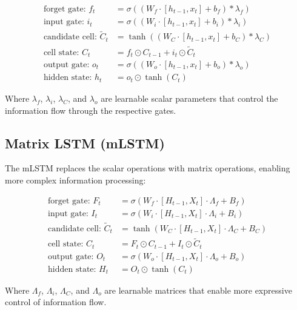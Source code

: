 \documentclass[11pt,a4paper]{article}
\begin{document}
\begin{align}
\text{forget gate: } f_t &= \sigma((W_f \cdot [h_{t-1}, x_t] + b_f) * \lambda_f) \label{eq:slstm_forget} \\
\text{input gate: } i_t &= \sigma((W_i \cdot [h_{t-1}, x_t] + b_i) * \lambda_i) \label{eq:slstm_input} \\
\text{candidate cell: } \tilde{C}_t &= \tanh((W_C \cdot [h_{t-1}, x_t] + b_C) * \lambda_C) \label{eq:slstm_candidate} \\
\text{cell state: } C_t &= f_t \odot C_{t-1} + i_t \odot \tilde{C}_t \label{eq:slstm_cell} \\
\text{output gate: } o_t &= \sigma((W_o \cdot [h_{t-1}, x_t] + b_o) * \lambda_o) \label{eq:slstm_output} \\
\text{hidden state: } h_t &= o_t \odot \tanh(C_t) \label{eq:slstm_hidden}
\end{align}

Where $\lambda_f$, $\lambda_i$, $\lambda_C$, and $\lambda_o$ are learnable scalar parameters that control the information flow through the respective gates.

\subsection{Matrix LSTM (mLSTM)}

The mLSTM replaces the scalar operations with matrix operations, enabling more complex information processing:

\begin{align}
\text{forget gate: } F_t &= \sigma(W_f \cdot [H_{t-1}, X_t] \cdot \Lambda_f + B_f) \label{eq:mlstm_forget} \\
\text{input gate: } I_t &= \sigma(W_i \cdot [H_{t-1}, X_t] \cdot \Lambda_i + B_i) \label{eq:mlstm_input} \\
\text{candidate cell: } \tilde{C}_t &= \tanh(W_C \cdot [H_{t-1}, X_t] \cdot \Lambda_C + B_C) \label{eq:mlstm_candidate} \\
\text{cell state: } C_t &= F_t \odot C_{t-1} + I_t \odot \tilde{C}_t \label{eq:mlstm_cell} \\
\text{output gate: } O_t &= \sigma(W_o \cdot [H_{t-1}, X_t] \cdot \Lambda_o + B_o) \label{eq:mlstm_output} \\
\text{hidden state: } H_t &= O_t \odot \tanh(C_t) \label{eq:mlstm_hidden}
\end{align}

Where $\Lambda_f$, $\Lambda_i$, $\Lambda_C$, and $\Lambda_o$ are learnable matrices that enable more expressive control of information flow.
\end{document}
